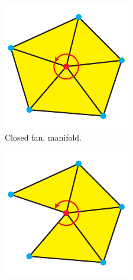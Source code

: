 \begin{description}
	\begin{figure}[h]
		\centering
		\begin{subfigure}[b]{0.4\textwidth}
			\includegraphics[width=\textwidth]{images/closed_fan}
			\caption{Closed fan, manifold.}
			\label{fig:closed_fan}
		\end{subfigure}
		\begin{subfigure}[b]{0.4\textwidth}
			\includegraphics[width=\textwidth]{images/open_fan}

\end{subfigure}
\end{figure}
\end{description}
